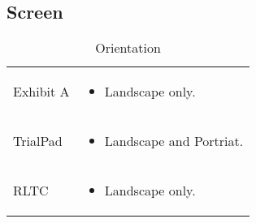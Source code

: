 \subsection{Screen}
\begin{center}
\begin{table}[htbp]
\label{tab:Orientation}
  \centering
  \caption{Orientation}
    \begin{tabular}{|p{}|p{}|}
    \hline
    \rowcolor{lightgrey}\multicolumn{2}{c}{Orientation} \\
    \hline
    Exhibit A &
    \begin{itemize}
      \item Landscape only.
      
    \end{itemize}\\
    \hline
    TrialPad &
    \begin{itemize}
      \item Landscape and Portriat.
      
    \end{itemize}\\
    \hline
    RLTC &
    \begin{itemize}
      \item Landscape only.
    \end{itemize}\\
    \hline
\end{tabular}
\end{table}
\end{center}



